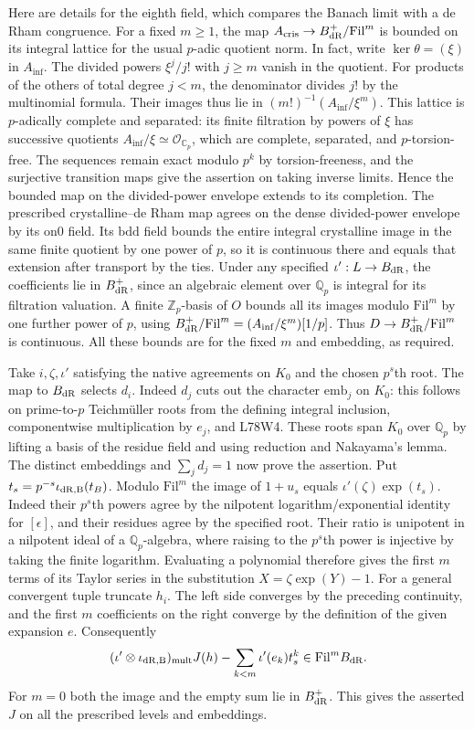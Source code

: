 Here are details for the eighth field, which compares the
Banach limit with a de Rham congruence. For a fixed $m\ge1$, the
map $A_{\rm cris}\to B_{\rm dR}^+/\mathrm{Fil}^m$ is bounded on
its integral lattice for the usual $p$-adic quotient norm. In fact,
write $\ker\theta=(\xi)$ in $A_{\inf}$.
The divided powers $\xi^j/j!$ with $j\ge m$ vanish in the
quotient. For products of the others of total degree $j<m$, the
denominator divides $j!$ by the multinomial formula. Their
images thus lie in $(m!)^{-1}(A_{\inf}/\xi^m)$.
This lattice is $p$-adically complete and separated: its finite
filtration by powers of $\xi$ has successive quotients
$A_{\inf}/\xi\simeq\mathcal O_{\mathbb C_p}$, which are complete,
separated, and $p$-torsion-free. The sequences remain exact modulo
$p^k$ by torsion-freeness, and the surjective transition maps give
the assertion on taking inverse limits. Hence the bounded map on
the divided-power envelope extends to its completion. The prescribed crystalline--de Rham map agrees on the dense
divided-power envelope by its \(\mathrm{on0}\) field. Its
\(\mathrm{bdd}\) field bounds the entire integral crystalline
image in the same finite quotient by one power of $p$, so it is
continuous there and equals that extension after transport by the
ties. Under any specified
$\iota':L\to B_{\rm dR}$, the coefficients lie in
$B_{\rm dR}^+$, since an algebraic element over $\mathbb Q_p$
is integral for its filtration valuation. A finite $\mathbb Z_p$-basis
of $O$ bounds all its images modulo $\mathrm{Fil}^m$ by one further
power of $p$, using
$B_{\rm dR}^+/\mathrm{Fil}^m=(A_{\inf}/\xi^m)[1/p]$.
Thus $D\to B_{\rm dR}^+/\mathrm{Fil}^m$ is continuous. All these
bounds are for the fixed $m$ and embedding, as required.

Take $i,\zeta,\iota'$ satisfying the native agreements on $K_0$
and the chosen $p^s$th root. The map to $B_{\rm dR}$ selects $d_i$.
Indeed $d_j$ cuts out the character $\mathrm{emb}_j$ on $K_0$:
this follows on prime-to-$p$ Teichm\"uller roots from the defining
integral inclusion, componentwise multiplication by $e_j$, and
L78W4. These roots span $K_0$ over $\mathbb Q_p$ by lifting a basis
of the residue field and using reduction and Nakayama's lemma.
The distinct embeddings and $\sum_j d_j=1$ now prove the assertion.
Put $t_s=p^{-s}\iota_{\rm dR,B}(t_B)$. Modulo
$\mathrm{Fil}^m$ the image of $1+u_s$ equals
$\iota'(\zeta)\exp(t_s)$. Indeed their $p^s$th powers agree by the
nilpotent logarithm/exponential identity for $[\epsilon]$, and
their residues agree by the specified root. Their ratio is
unipotent in a nilpotent ideal of a $\mathbb Q_p$-algebra, where
raising to the $p^s$th power is injective by taking the finite
logarithm. Evaluating a polynomial therefore gives the first $m$
terms of its Taylor series in the substitution $X=\zeta\exp(Y)-1$.
For a general convergent tuple truncate $h_i$. The left side
converges by the preceding continuity, and the first $m$ coefficients
on the right converge by the definition of the given expansion
$e$. Consequently
\[
 (\iota'\otimes\iota_{\rm dR,B})_{\rm mult}J(h)
 -\sum_{k<m}\iota'(e_k)t_s^k\in\mathrm{Fil}^m B_{\rm dR}.
\]
For $m=0$ both the image and the empty sum lie in $B_{\rm dR}^+$.
This gives the asserted $J$ on all the prescribed levels and embeddings.

